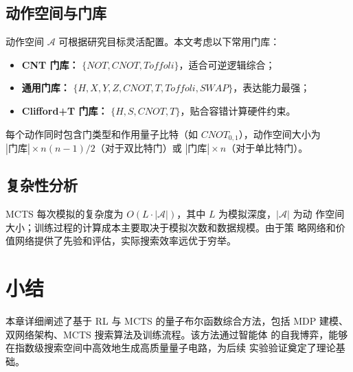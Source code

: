 \documentclass[11pt,letterpaper]{ctexart}
\begin{document}
\subsection{动作空间与门库}

动作空间 $\mathcal{A}$ 可根据研究目标灵活配置。本文考虑以下常用门库：

\begin{itemize}
  \item \textbf{CNT 门库：} $\{NOT,CNOT,Toffoli\}$，适合可逆逻辑综合；

  \item \textbf{通用门库：} $\{H,X,Y,Z,CNOT,T,Toffoli,SWAP\}$，表达能力最强；

  \item \textbf{Clifford+T 门库：} $\{H,S,CNOT,T\}$，贴合容错计算硬件约束。
\end{itemize}

\newpage

每个动作同时包含门类型和作用量子比特（如 $CNOT_{0,1}$），动作空间大小为
$|\text{门库}| \times n(n-1)/2$（对于双比特门）或 $|\text{门库}| \times n$（对于单比特门）。

\subsection{复杂性分析}

MCTS 每次模拟的复杂度为 $O(L\cdot|\mathcal{A}|)$，其中 $L$ 为模拟深度，$|\mathcal{A}|$ 为动
作空间大小；训练过程的计算成本主要取决于模拟次数和数据规模。由于策
略网络和价值网络提供了先验和评估，实际搜索效率远优于穷举。

\section{小结}

本章详细阐述了基于 RL 与 MCTS 的量子布尔函数综合方法，包括
MDP 建模、双网络架构、MCTS 搜索算法及训练流程。该方法通过智能体
的自我博弈，能够在指数级搜索空间中高效地生成高质量量子电路，为后续
实验验证奠定了理论基础。
\end{document}
